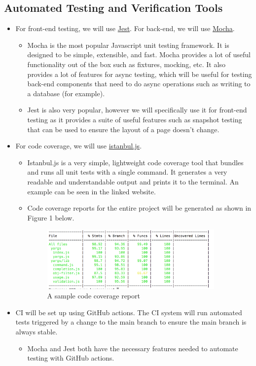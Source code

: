 \documentclass[12pt, titlepage]{article}
\begin{document}
\subsection{Automated Testing and Verification Tools}
\label{s4.6}

\begin{itemize}
\item For front-end testing, we will use \href{https://jestjs.io/}{Jest}. For back-end, we will use \href{https://mochajs.org/}{Mocha}.
\begin{itemize}
    \item Mocha is the most popular Javascript unit testing framework. It is designed to be simple, extensible, and fast. Mocha provides a lot of useful functionality out of the box such as fixtures, mocking, etc. It also provides a lot of features for async testing, which will be useful for testing back-end components that need to do async operations such as writing to a database (for example). 
    
    \item Jest is also very popular, however we will specifically use it for front-end testing as it provides a suite of useful features such as snapshot testing that can be used to ensure the layout of a page doesn't change.
\end{itemize}

\item For code coverage, we will use \href{https://istanbul.js.org/}{istanbul.js}.
\begin{itemize}
    \item Istanbul.js is a very simple, lightweight code coverage tool that bundles and runs all unit tests with a single command. It generates a very readable and understandable output and prints it to the terminal. An example can be seen in the linked website. 
    \item Code coverage reports for the entire project will be generated as shown in Figure 1 below. \\
    \begin{figure}[H]
    \includegraphics[width=0.9\textwidth]{CodeCoverage}
    \caption{A sample code coverage report}
    \end{figure}
\end{itemize}
\item CI will be set up using GitHub actions. The CI system will run automated tests triggered by a change to the main branch to ensure the main branch is always stable.
\begin{itemize}
    \item Mocha and Jest both have the necessary features needed to automate testing with GitHub actions.
\end{itemize}


\end{itemize}
\end{document}

